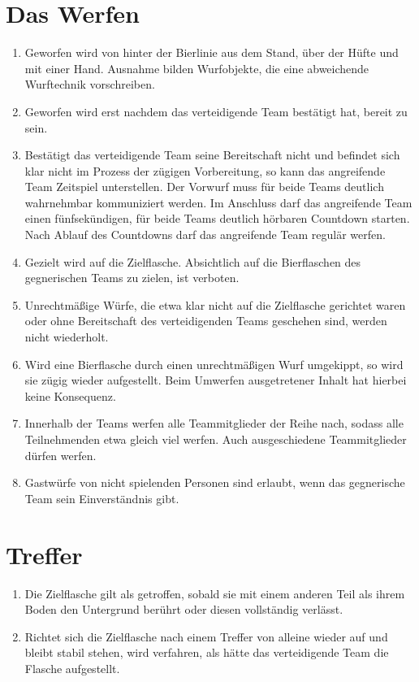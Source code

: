 \section{Das Werfen}
\begin{enumerate}[label={(\arabic*)}]
    \item
    Geworfen wird von hinter der Bierlinie aus dem Stand, über der Hüfte und mit einer Hand.
    Ausnahme bilden Wurfobjekte, die eine abweichende Wurftechnik vorschreiben.

    \item
    Geworfen wird erst nachdem das verteidigende Team bestätigt hat, bereit zu sein.

    \item
    Bestätigt das verteidigende Team seine Bereitschaft nicht und befindet sich klar nicht im Prozess der zügigen Vorbereitung, so kann das angreifende Team Zeitspiel unterstellen.
    Der Vorwurf muss für beide Teams deutlich wahrnehmbar kommuniziert werden.
    Im Anschluss darf das angreifende Team einen fünfsekündigen, für beide Teams deutlich hörbaren Countdown starten.
    Nach Ablauf des Countdowns darf das angreifende Team regulär werfen.

    \item
    Gezielt wird auf die Zielflasche.
    Absichtlich auf die Bierflaschen des gegnerischen Teams zu zielen, ist verboten.

    \item
    Unrechtmäßige Würfe, die etwa klar nicht auf die Zielflasche gerichtet waren oder ohne Bereitschaft des verteidigenden Teams geschehen sind, werden nicht wiederholt.

    \item
    Wird eine Bierflasche durch einen unrechtmäßigen Wurf umgekippt, so wird sie zügig wieder aufgestellt.
    Beim Umwerfen ausgetretener Inhalt hat hierbei keine Konsequenz.

    \item
    Innerhalb der Teams werfen alle Teammitglieder der Reihe nach, sodass alle Teilnehmenden etwa gleich viel werfen.
    Auch ausgeschiedene Teammitglieder dürfen werfen.

    \item
    Gastwürfe von nicht spielenden Personen sind erlaubt, wenn das gegnerische Team sein Einverständnis gibt.
\end{enumerate}

\section{Treffer}
\begin{enumerate}[label={(\arabic*)}]
    \item\label{Flunkyball:Treffer:Allg}
    Die Zielflasche gilt als getroffen, sobald sie mit einem anderen Teil als ihrem Boden den Untergrund berührt oder diesen vollständig verlässt.

    \item 
    Richtet sich die Zielflasche nach einem Treffer von alleine wieder auf und bleibt stabil stehen, wird verfahren, als hätte das verteidigende Team die Flasche aufgestellt.
\end{enumerate}

